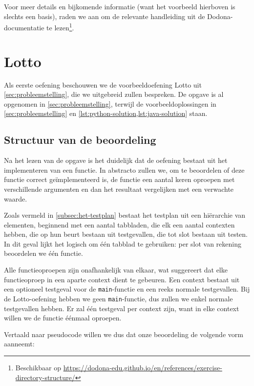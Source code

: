 \inputminted{text}{code/dirs-exercise.txt}

Voor meer details en bijkomende informatie (want het voorbeeld hierboven is slechts een basis), raden we aan om de relevante handleiding uit de Dodona-documentatie te lezen\footnote{Beschikbaar op \url{https://dodona-edu.github.io/en/references/exercise-directory-structure/}}.

\section{Lotto}\label{sec:oefening-lotto}

Als eerste oefening beschouwen we de voorbeeldoefening Lotto uit \cref{sec:probleemstelling}, die we uitgebreid zullen bespreken.
De opgave is al opgenomen in \cref{sec:probleemstelling}, terwijl de voorbeeldoplossingen in \cref{sec:probleemstelling} en \cref{lst:python-solution,lst:java-solution} staan.

\subsection{Structuur van de beoordeling}\label{subsec:oefening-lotto-structuur}

Na het lezen van de opgave is het duidelijk dat de oefening bestaat uit het implementeren van een functie.
In abstracto zullen we, om te beoordelen of deze functie correct geïmplementeerd is, de functie een aantal keren oproepen met verschillende argumenten en dan het resultaat vergelijken met een verwachte waarde.

Zoals vermeld in \cref{subsec:het-testplan} bestaat het testplan uit een hiërarchie van elementen, beginnend met een aantal tabbladen, die elk een aantal contexten hebben, die op hun beurt bestaan uit testgevallen, die tot slot bestaan uit testen.
In dit geval lijkt het logisch om één tabblad te gebruiken: per slot van rekening beoordelen we één functie.

Alle functieoproepen zijn onafhankelijk van elkaar, wat suggereert dat elke functieoproep in een aparte context dient te gebeuren.
Een context bestaat uit een optioneel testgeval voor de \texttt{main}-functie en een reeks normale testgevallen.
Bij de Lotto-oefening hebben we geen \texttt{main}-functie, dus zullen we enkel normale testgevallen hebben.
Er zal één testgeval per context zijn, want in elke context willen we de functie éénmaal oproepen.

Vertaald naar pseudocode willen we dus dat onze beoordeling de volgende vorm aanneemt:

